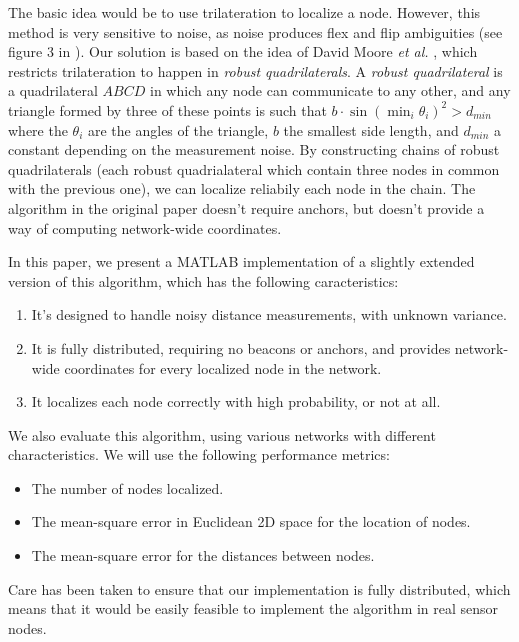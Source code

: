\documentclass[letterpaper, 10 pt, conference]{ieeeconf}  %
\begin{document}
The basic idea would be to use trilateration to localize a node. However, this method is very sensitive to noise, as noise produces flex and flip ambiguities (see figure 3 in \cite{MooreTeller}). Our solution is based on the idea of David Moore \emph{et al.} \cite{MooreTeller}, which restricts trilateration to happen in \emph{robust quadrilaterals}. A \emph{robust quadrilateral} is a quadrilateral $ABCD$ in which any node can communicate to any other, and any triangle formed by three of these points is such that $b \cdot \sin(\min_i \theta_i)^2 > d_{min} $ where the $\theta_i$ are the angles of the triangle, $b$ the smallest side length, and $d_{min}$ a constant depending on the measurement noise. By constructing chains of robust quadrilaterals (each robust quadrialateral which contain three nodes in common with the previous one), we can localize reliabily each node in the chain. The algorithm in the original paper doesn't require anchors, but doesn't provide a way of computing network-wide coordinates.

In this paper, we present a MATLAB implementation of a slightly extended version of this algorithm, which has the following caracteristics:

\begin{enumerate}
    \item It's designed to handle noisy distance measurements, with unknown variance.
    \item It is fully distributed, requiring no beacons or anchors, and provides network-wide coordinates for every localized node in the network.
    \item It localizes each node correctly with high probability, or not at all.
\end{enumerate}

We also evaluate this algorithm, using various networks with different characteristics. We will use the following performance metrics:

\begin{itemize}
    \item The number of nodes localized.
    \item The mean-square error in Euclidean 2D space for the location of nodes.
    \item The mean-square error for the distances between nodes.
\end{itemize}

Care has been taken to ensure that our implementation is fully distributed, which means that it would be easily feasible to implement the algorithm in real sensor nodes.
\end{document}
